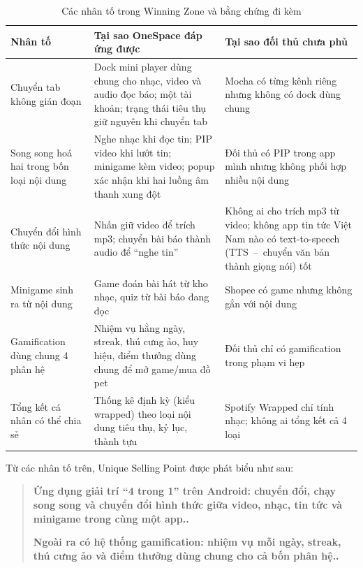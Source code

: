 \begin{table}[H]
    \centering
    \caption{Các nhân tố trong Winning Zone và bằng chứng đi kèm}
    \label{tab:winning-zone}
    \begin{tabularx}{\textwidth}{>{\raggedright\arraybackslash}p{3.1cm} >{\raggedright\arraybackslash}X >{\raggedright\arraybackslash}X}
        \toprule
        \textbf{Nhân tố} & \textbf{Tại sao OneSpace đáp ứng được} & \textbf{Tại sao đối thủ chưa phủ} \\
        \midrule
        Chuyển tab không gián đoạn & Dock mini player dùng chung cho nhạc, video và audio đọc báo; một tài khoản; trạng thái tiêu thụ giữ nguyên khi chuyển tab & Mocha có từng kênh riêng nhưng không có dock dùng chung \\
        \addlinespace
        Song song hoá hai trong bốn loại nội dung & Nghe nhạc khi đọc tin; PIP video khi lướt tin; minigame kèm video; popup xác nhận khi hai luồng âm thanh xung đột & Đối thủ có PIP trong app mình nhưng không phối hợp nhiều nội dung \\
        \addlinespace
        Chuyển đổi hình thức nội dung & Nhấn giữ video để trích mp3; chuyển bài báo thành audio để ``nghe tin'' & Không ai cho trích mp3 từ video; không app tin tức Việt Nam nào có text-to-speech (TTS~--~chuyển văn bản thành giọng nói) tốt \\
        \addlinespace
        Minigame sinh ra từ nội dung & Game đoán bài hát từ kho nhạc, quiz từ bài báo đang đọc & Shopee có game nhưng không gắn với nội dung \\
        \addlinespace
        Gamification dùng chung 4 phân hệ & Nhiệm vụ hằng ngày, streak, thú cưng ảo, huy hiệu, điểm thưởng dùng chung để mở game/mua đồ pet & Đối thủ chỉ có gamification trong phạm vi hẹp \\
        \addlinespace
        Tổng kết cá nhân có thể chia sẻ & Thống kê định kỳ (kiểu wrapped) theo loại nội dung tiêu thụ, kỷ lục, thành tựu & Spotify Wrapped chỉ tính nhạc; không ai tổng kết cả 4 loại \\
        \bottomrule
    \end{tabularx}
\end{table}

Từ các nhân tố trên, Unique Selling Point được phát biểu như sau:

\begin{quote}
    \textbf{Ứng dụng giải trí ``4 trong 1'' trên Android: chuyển đổi, chạy song song và chuyển đổi hình thức giữa video, nhạc, tin tức và minigame trong cùng một app..}
    \par\vspace{2pt}
    \textbf{Ngoài ra có hệ thống gamification: nhiệm vụ mỗi ngày, streak, thú cưng ảo và điểm thưởng dùng chung cho cả bốn phân hệ..}
\end{quote}

